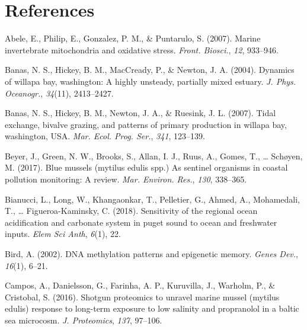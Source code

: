\documentclass [11pt, proquest] {uwthesis}[2015/03/03]
\newlength{\cslhangindent}
\newenvironment{CSLReferences}%
{\setlength{\parindent}{0pt}%
\everypar{\setlength{\hangindent}{\cslhangindent}}\ignorespaces}%
{\par}
\begin{document}
\hypertarget{references}{%
\chapter*{References}\label{references}}


\noindent

\setlength{\parindent}{-0.20in}
\setlength{\leftskip}{0.20in}
\setlength{\parskip}{8pt}

\hypertarget{refs}{}
\begin{CSLReferences}{1}{0}
\leavevmode\hypertarget{ref-Abele2007}{}%
Abele, E., Philip, E., Gonzalez, P. M., \& Puntarulo, S. (2007). Marine invertebrate mitochondria and oxidative stress. \emph{Front. Biosci.}, \emph{12}, 933--946.

\leavevmode\hypertarget{ref-Banas2004}{}%
Banas, N. S., Hickey, B. M., MacCready, P., \& Newton, J. A. (2004). Dynamics of willapa bay, washington: A highly unsteady, partially mixed estuary. \emph{J. Phys. Oceanogr.}, \emph{34}(11), 2413--2427.

\leavevmode\hypertarget{ref-Banas2007}{}%
Banas, N. S., Hickey, B. M., Newton, J. A., \& Ruesink, J. L. (2007). Tidal exchange, bivalve grazing, and patterns of primary production in willapa bay, washington, {USA}. \emph{Mar. Ecol. Prog. Ser.}, \emph{341}, 123--139.

\leavevmode\hypertarget{ref-Beyer2017}{}%
Beyer, J., Green, N. W., Brooks, S., Allan, I. J., Ruus, A., Gomes, T., \ldots{} Schøyen, M. (2017). Blue mussels (mytilus edulis spp.) As sentinel organisms in coastal pollution monitoring: A review. \emph{Mar. Environ. Res.}, \emph{130}, 338--365.

\leavevmode\hypertarget{ref-Bianucci2018}{}%
Bianucci, L., Long, W., Khangaonkar, T., Pelletier, G., Ahmed, A., Mohamedali, T., \ldots{} Figueroa-Kaminsky, C. (2018). Sensitivity of the regional ocean acidification and carbonate system in puget sound to ocean and freshwater inputs. \emph{Elem Sci Anth}, \emph{6}(1), 22.

\leavevmode\hypertarget{ref-Bird2002}{}%
Bird, A. (2002). {DNA} methylation patterns and epigenetic memory. \emph{Genes Dev.}, \emph{16}(1), 6--21.

\leavevmode\hypertarget{ref-Campos2016}{}%
Campos, A., Danielsson, G., Farinha, A. P., Kuruvilla, J., Warholm, P., \& Cristobal, S. (2016). Shotgun proteomics to unravel marine mussel (mytilus edulis) response to long-term exposure to low salinity and propranolol in a baltic sea microcosm. \emph{J. Proteomics}, \emph{137}, 97--106.


\end{CSLReferences}
\end{document}
